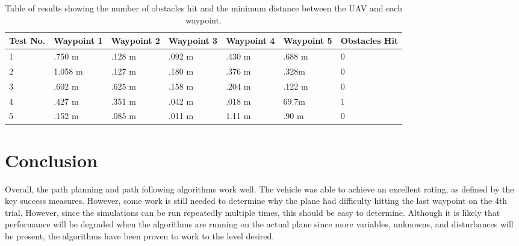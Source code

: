 \documentclass[]{auvsi_doc}
\begin{document}
\begin{table}[h!]

\caption{Table of results showing the number of obstacles hit and the minimum distance between the UAV and each waypoint.}
\label{tab:results}
\begin{tabular} {|l|l|l|l|l|l|l|}
\hline
Test No. & Waypoint 1&Waypoint 2&Waypoint 3&Waypoint 4&Waypoint 5& Obstacles Hit\\
\hline
1 & .750 m& .128 m& .092 m& .430 m& .688 m & 0\\
2 & 1.058 m &.127 m & .180 m & .376 m & .328m & 0\\
3& .602 m& .625 m&.158 m& .204 m& .122 m& 0\\
4& .427 m & .351 m & .042 m & .018 m& 69.7m& 1\\
5& .152 m& .085 m& .011 m & 1.11 m & .90 m& 0\\
\hline
\end{tabular}
\end{table}


\section*{Conclusion}

Overall, the path planning and path following algorithms work well. The vehicle was able to achieve an excellent rating, as defined by the key success measures.
However, some work is still needed to determine why the plane had difficulty hitting the last waypoint on the 4th trial. However, since the simulations can be run repeatedly multiple times, this should be easy to determine.
Although it is likely that performance will be degraded when the algorithms are running on the actual plane since more variables, unknowns, and disturbances will be present, the algorithms have been proven to work to the level desired.

\end{document}
